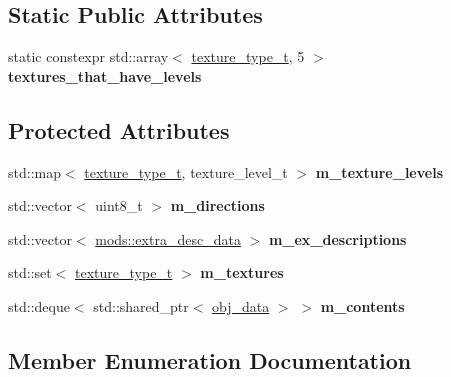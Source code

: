 \subsection*{Static Public Attributes}
\begin{DoxyCompactItemize}
\item 
static constexpr std\+::array$<$ \hyperlink{structroom__data_a9552b46091ee649079e41f04f9543b8e}{texture\+\_\+type\+\_\+t}, 5 $>$ {\bfseries textures\+\_\+that\+\_\+have\+\_\+levels}
\end{DoxyCompactItemize}
\subsection*{Protected Attributes}
\begin{DoxyCompactItemize}
\item 
\mbox{\label{structroom__data_a99d435147a074558d8c9885b91d79817}} 
std\+::map$<$ \hyperlink{structroom__data_a9552b46091ee649079e41f04f9543b8e}{texture\+\_\+type\+\_\+t}, texture\+\_\+level\+\_\+t $>$ {\bfseries m\+\_\+texture\+\_\+levels}
\item 
\mbox{\label{structroom__data_a0ffb7df8066794ff035aa6aab126cb82}} 
std\+::vector$<$ uint8\+\_\+t $>$ {\bfseries m\+\_\+directions}
\item 
\mbox{\label{structroom__data_acf2fa02a703a383c7d69e75ec7d2d606}} 
std\+::vector$<$ \hyperlink{structmods_1_1extra__desc__data}{mods\+::extra\+\_\+desc\+\_\+data} $>$ {\bfseries m\+\_\+ex\+\_\+descriptions}
\item 
\mbox{\label{structroom__data_ab6153c67ebe5af94f1349ce4342dce93}} 
std\+::set$<$ \hyperlink{structroom__data_a9552b46091ee649079e41f04f9543b8e}{texture\+\_\+type\+\_\+t} $>$ {\bfseries m\+\_\+textures}
\item 
\mbox{\label{structroom__data_a800e7e5c6c49f9d96b62922b9b183b21}} 
std\+::deque$<$ std\+::shared\+\_\+ptr$<$ \hyperlink{structobj__data}{obj\+\_\+data} $>$ $>$ {\bfseries m\+\_\+contents}
\end{DoxyCompactItemize}


\subsection{Member Enumeration Documentation}
\mbox{\label{structroom__data_a9552b46091ee649079e41f04f9543b8e}} 
